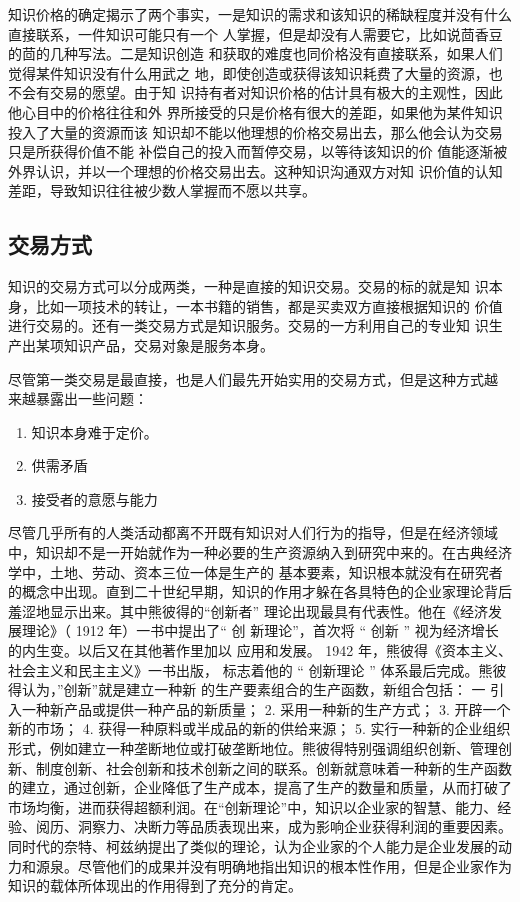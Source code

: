 \documentclass[12pt,a4paper]{Ctexart}
\begin{document}
知识价格的确定揭示了两个事实，一是知识的需求和该知识的稀缺程度并没有什么直接联系，一件知识可能只有一个
  人掌握，但是却没有人需要它，比如说茴香豆的茴的几种写法。二是知识创造
  和获取的难度也同价格没有直接联系，如果人们觉得某件知识没有什么用武之
  地，即使创造或获得该知识耗费了大量的资源，也不会有交易的愿望。由于知
  识持有者对知识价格的估计具有极大的主观性，因此他心目中的价格往往和外
  界所接受的只是价格有很大的差距，如果他为某件知识投入了大量的资源而该
  知识却不能以他理想的价格交易出去，那么他会认为交易只是所获得价值不能
  补偿自己的投入而暂停交易，以等待该知识的价
  值能逐渐被外界认识，并以一个理想的价格交易出去。这种知识沟通双方对知
  识价值的认知差距，导致知识往往被少数人掌握而不愿以共享。

\subsection{交易方式}
知识的交易方式可以分成两类，一种是直接的知识交易。交易的标的就是知
识本身，比如一项技术的转让，一本书籍的销售，都是买卖双方直接根据知识的
价值进行交易的。还有一类交易方式是知识服务。交易的一方利用自己的专业知
识生产出某项知识产品，交易对象是服务本身。

尽管第一类交易是最直接，也是人们最先开始实用的交易方式，但是这种方式越
来越暴露出一些问题：
\begin{enumerate}
\item 知识本身难于定价。
\item 供需矛盾
\item 接受者的意愿与能力
\end{enumerate}



尽管几乎所有的人类活动都离不开既有知识对人们行为的指导，但是在经济领域中，知识却不是一开始就作为一种必要的生产资源纳入到研究中来的。在古典经济学中，土地、劳动、资本三位一体是生产的
基本要素，知识根本就没有在研究者的概念中出现。直到二十世纪早期，知识的作用才躲在各具特色的企业家理论背后羞涩地显示出来。其中熊彼得的“创新者”
理论出现最具有代表性。他在《经济发展理论》（ 1912 年）一书中提出了“ 创
新理论”，首次将 “ 创新 ” 视为经济增长的内生变。以后又在其他著作里加以
应用和发展。 1942 年，熊彼得《资本主义、社会主义和民主主义》一书出版，
标志着他的 “ 创新理论 ” 体系最后完成。熊彼得认为，”创新”就是建立一种新
的生产要素组合的生产函数，新组合包括： 一 引入一种新产品或提供一种产品的新质量； 2. 采用一种新的生产方式； 3. 开辟一个新的市场； 4. 获得一种原料或半成品的新的供给来源； 5. 实行一种新的企业组织形式，例如建立一种垄断地位或打破垄断地位。熊彼得特别强调组织创新、管理创新、制度创新、社会创新和技术创新之间的联系。创新就意味着一种新的生产函数的建立，通过创新，企业降低了生产成本，提高了生产的数量和质量，从而打破了市场均衡，进而获得超额利润。在“创新理论”中，知识以企业家的智慧、能力、经验、阅历、洞察力、决断力等品质表现出来，成为影响企业获得利润的重要因素。同时代的奈特、柯兹纳提出了类似的理论，认为企业家的个人能力是企业发展的动力和源泉。尽管他们的成果并没有明确地指出知识的根本性作用，但是企业家作为知识的载体所体现出的作用得到了充分的肯定。
\end{document}
